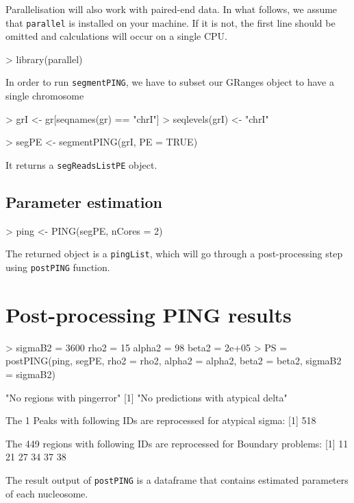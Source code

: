 \documentclass[11pt]{article}
\begin{document}
Parallelisation will also work with paired-end data. In what follows, we assume that \texttt{parallel} is installed on your machine. If it is not, the first line should be omitted and calculations will occur on a single CPU.

\begin{Schunk}
\begin{Sinput}
> library(parallel)
\end{Sinput}
\end{Schunk}

In order to run \texttt{segmentPING}, we have to subset our GRanges object to have a single chromosome
\begin{Schunk}
\begin{Sinput}
> grI <- gr[seqnames(gr) == "chrI"]
> seqlevels(grI) <- "chrI"
\end{Sinput}
\end{Schunk}

\begin{Schunk}
\begin{Sinput}
> segPE <- segmentPING(grI, PE = TRUE)
\end{Sinput}
\end{Schunk}

It returns a \texttt{segReadsListPE} object.


\subsection{Parameter estimation}

\begin{Schunk}
\begin{Sinput}
> ping <- PING(segPE, nCores = 2)
\end{Sinput}
\end{Schunk}
The returned object is a \texttt{pingList}, which will go through a post-processing step using \texttt{postPING} function.


\section{Post-processing PING results}

\begin{Schunk}
\begin{Sinput}
> {
     sigmaB2 = 3600
     rho2 = 15
     alpha2 = 98
     beta2 = 2e+05
 }
> PS = postPING(ping, segPE, rho2 = rho2, alpha2 = alpha2, beta2 = beta2, 
     sigmaB2 = sigmaB2)
\end{Sinput}
\begin{Soutput}
[1] "No regions with pingerror"
[1] "No predictions with atypical delta"

 The 1 Peaks with following IDs are reprocessed for atypical sigma: 
[1] 518

 The 449 regions with following IDs are reprocessed for Boundary problems: 
[1] 11 21 27 34 37 38
\end{Soutput}
\end{Schunk}
The result output of \texttt{postPING} is a dataframe that contains estimated parameters of each nucleosome.
\end{document}
